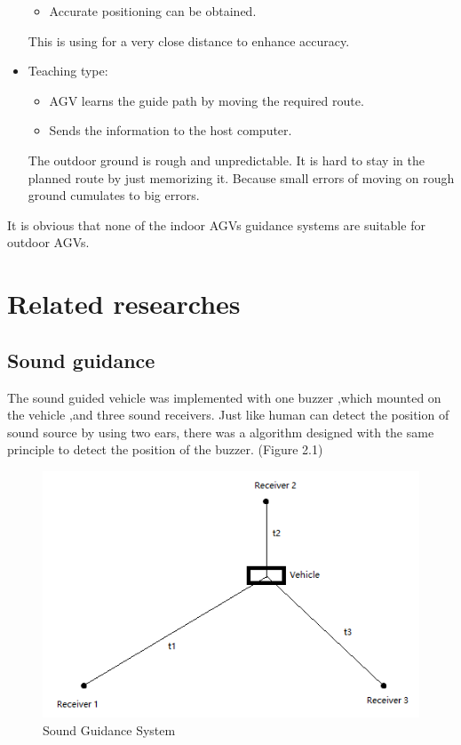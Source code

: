 \documentclass[letterpaper,12pt,oneside]{book}
\begin{document}
\begin{itemize}
\begin{itemize}
				\item Accurate positioning can be obtained.
			\end{itemize}
			This is using for a very close distance to enhance accuracy.
			\item Teaching type:
			\begin{itemize}
				\item AGV learns the guide path by moving the required route.
				\item Sends the information to the host computer.
			\end{itemize}
			The outdoor ground is rough and unpredictable. It is hard to stay in the planned route by just memorizing it. Because small errors of moving on rough ground cumulates to big errors. 
		\end{itemize}
		It is obvious that none of the indoor AGVs guidance systems are suitable for outdoor AGVs.
		
		\section{Related researches}
		\subsection{Sound guidance}
		The sound guided vehicle was implemented with one buzzer ,which mounted on the vehicle ,and three sound receivers. Just like human can detect the position of sound source by using two ears, there was a algorithm designed with the same principle to detect the position of the buzzer. (Figure 2.1) 
		\begin{figure}[ht!]
			\begin{center}
				\includegraphics[scale = 1]{soundguided.png}
				\caption{Sound Guidance System}
			\end{center}
		\end{figure}
		
\end{document}
